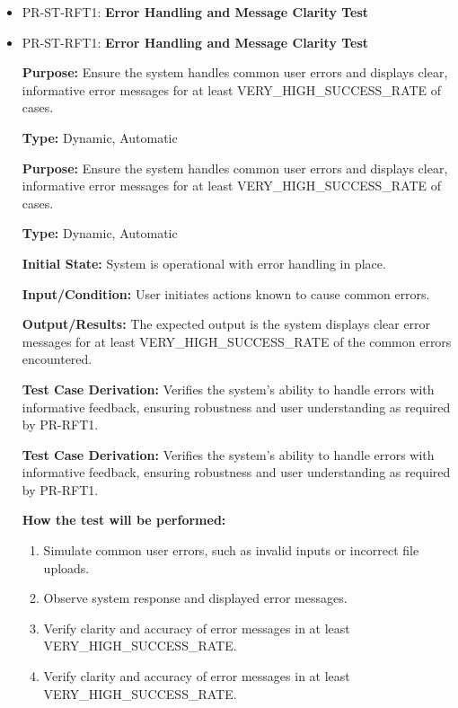\documentclass[12pt, titlepage]{article}
\begin{document}
\begin{itemize}
  \item PR-ST-RFT1: \textbf{Error Handling and Message Clarity Test}
  \item PR-ST-RFT1: \textbf{Error Handling and Message Clarity Test}
  \begin{mdframed}[linewidth=0.5mm]
      \textbf{Purpose:} Ensure the system handles common user errors and displays clear, informative error messages for at least VERY\_HIGH\_SUCCESS\_RATE of cases. \par
      \textbf{Type:} Dynamic, Automatic \par
      \textbf{Purpose:} Ensure the system handles common user errors and displays clear, informative error messages for at least VERY\_HIGH\_SUCCESS\_RATE of cases. \par
      \textbf{Type:} Dynamic, Automatic \par
      \textbf{Initial State:} System is operational with error handling in place. \par
      \textbf{Input/Condition:} User initiates actions known to cause common errors. \par
      \textbf{Output/Results:} The expected output is the system displays clear error messages for at least VERY\_HIGH\_SUCCESS\_RATE of the common errors encountered. \par
      \textbf{Test Case Derivation:} Verifies the system’s ability to handle errors with \\ informative feedback, ensuring robustness and user understanding as required by PR-RFT1. \par
      \textbf{Test Case Derivation:} Verifies the system’s ability to handle errors with \\ informative feedback, ensuring robustness and user understanding as required by PR-RFT1. \par
      \textbf{How the test will be performed:}
      \begin{enumerate}[noitemsep]
        \item Simulate common user errors, such as invalid inputs or incorrect file uploads.
        \item Observe system response and displayed error messages.
        \item Verify clarity and accuracy of error messages in at least \\ VERY\_HIGH\_SUCCESS\_RATE.
        \item Verify clarity and accuracy of error messages in at least \\ VERY\_HIGH\_SUCCESS\_RATE.
      \end{enumerate}
  \end{mdframed}


\end{itemize}
\end{document}
